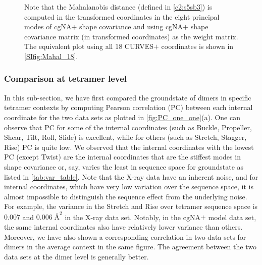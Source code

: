 \begin{figure}[htb!]
\begin{center}
{	Note that the Mahalanobis distance (defined in \cref{c2:s5sb3}) is computed in the transformed coordinates in the eight principal modes of cgNA$+$ shape covariance and using cgNA$+$ shape covariance matrix (in transformed coordinates) as the weight matrix. 
    The equivalent plot using all 18 CURVES$+$ coordinates is shown in \cref{SIfig:Mahal_18}.
	}
\label{fig:Mahal_8}
\end{center}
\end{figure}

\subsubsection{Comparison at tetramer level} \label{ss:comp_tet}

In this sub-section, we have first compared the groundstate of dimers in specific tetramer contexts by computing Pearson correlation (PC) between each internal coordinate for the two data sets as plotted in \cref{fig:PC_one_one}(a).
One can observe that PC for some of the internal coordinates (such as Buckle, Propeller, Shear, Tilt, Roll, Slide) is excellent, while for others (such as Stretch, Stagger, Rise) PC is quite low.
We observed that the internal coordinates with the lowest PC (except Twist) are the internal coordinates that are the stiffest modes in shape covariance or, say, varies the least in sequence space for groundstate as listed in \cref{tab:var_table}. 
Note that the X-ray data have an inherent noise, and for internal coordinates, which have very low variation over the sequence space, it is almost impossible to distinguish the sequence effect from the underlying noise.
For example, the variance in the Stretch and Rise over tetramer sequence space is $0.007$ and $0.006 \; \text{\AA}^2$ in the X-ray data set. 
Notably, in the cgNA$+$ model data set, the same internal coordinates also have relatively lower variance than others.
Moreover, we have also shown a corresponding correlation in two data sets for dimers in the average context in the same figure. 
The agreement between the two data sets at the dimer level is generally better. 

